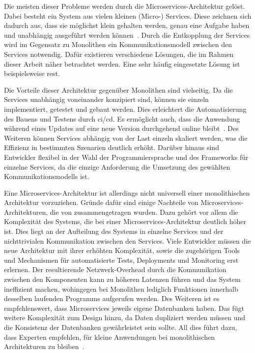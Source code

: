 Die meisten dieser Probleme werden durch die Microservices-Architektur gelöst.
Dabei besteht ein System aus vielen kleinen (Micro-) Services.
Diese zeichnen sich dadurch aus, dass sie möglichst klein gehalten werden, genau eine Aufgabe haben und unabhängig ausgeführt werden können~\cite{a-survey-on}.
Durch die Entkopplung der Services wird im Gegensatz zu Monolithen ein Kommunikationsmodell zwischen den Services notwendig.
Dafür existieren verschiedene Lösungen, die im Rahmen dieser Arbeit näher betrachtet werden.
Eine sehr häufig eingesetzte Lösung ist beispielsweise \gls{rest}.

Die Vorteile dieser Architektur gegenüber Monolithen sind vielseitig.
Da die Services unabhängig voneinander konzipiert sind, können sie einzeln implementiert, getestet und gebaut werden.
Dies erleichtert die Automatisierung des Bauens und Testens durch \gls{ci}/\gls{cd}.
Es ermöglicht auch, dass die Anwendung während eines Updates auf eine neue Version durchgehend online bleibt~\cite{a-survey-on}.
Des Weiteren können Services abhängig von der Last einzeln skaliert werden, was die Effizienz in bestimmten Szenarien deutlich erhöht.
Darüber hinaus sind Entwickler flexibel in der Wahl der Programmiersprache und des Frameworks für einzelne Services, da die einzige Anforderung die Umsetzung des gewählten Kommunikationsmodells ist.

Eine Microservices-Architektur ist allerdings nicht universell einer monolithischen Architektur vorzuziehen.
Gründe dafür sind einige Nachteile von Microservices-Architekturen, die von  zusammengetragen wurden.
Dazu gehört vor allem die Komplexität des Systems, die bei einer Microservices-Architektur deutlich höher ist.
Dies liegt an der Aufteilung des Systems in einzelne Services und der nichttrivialen Kommunikation zwischen den Services.
Viele Entwickler müssen die neue Architektur mit ihrer erhöhten Komplexität, sowie die zugehörigen Tools und Mechanismen für automatisierte Tests, Deployments und Monitoring erst erlernen.
Der resultierende Netzwerk-Overhead durch die Kommunikation zwischen den Komponenten kann zu höheren Latenzen führen und das System ineffizient machen, wohingegen bei Monolithen lediglich Funktionen innerhalb desselben laufenden Programms aufgerufen werden.
Des Weiteren ist es empfehlenswert, dass Microservices jeweils eigene Datenbanken haben.
Das fügt weitere Komplexität zum Design hinzu, da Daten dupliziert werden müssen und die Konsistenz der Datenbanken gewährleistet sein sollte.
All dies führt dazu, dass Experten empfehlen, für kleine Anwendungen bei monolithischen Architekturen zu bleiben~\cite{a-survey-on,7742218}.

